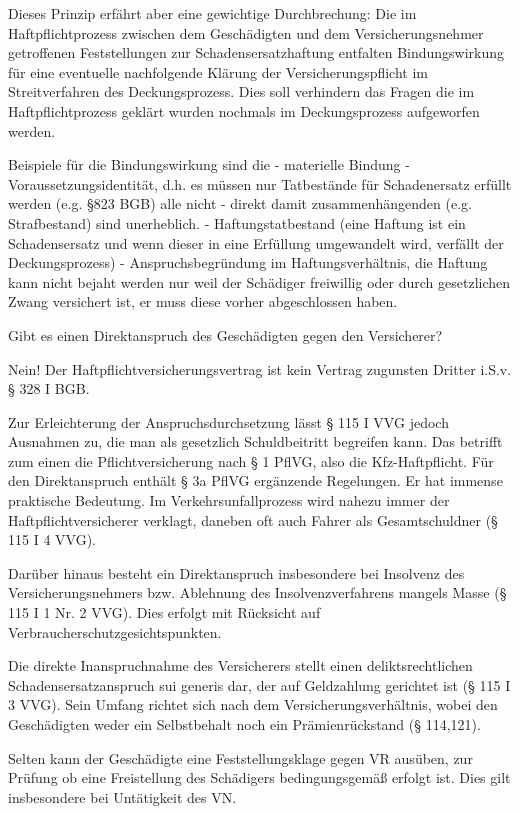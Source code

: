 Dieses Prinzip erfährt aber eine gewichtige Durchbrechung: 
Die im Haftpflichtprozess zwischen dem Geschädigten und dem Versicherungsnehmer getroffenen Feststellungen zur Schadensersatzhaftung entfalten 
Bindungswirkung für eine eventuelle nachfolgende Klärung der Versicherungspflicht im Streitverfahren des Deckungsprozess.
Dies soll verhindern das Fragen die im Haftpflichtprozess geklärt wurden nochmals im Deckungsprozess aufgeworfen werden.

Beispiele für die Bindungswirkung sind die
- materielle Bindung
- Voraussetzungsidentität, d.h. es müssen nur Tatbestände für Schadenersatz erfüllt werden (e.g. §823 BGB) alle nicht 
- direkt damit zusammenhängenden (e.g. Strafbestand) sind unerheblich.
- Haftungstatbestand (eine Haftung ist ein Schadensersatz und wenn dieser in eine Erfüllung umgewandelt wird, verfällt der Deckungsprozess)
- Anspruchsbegründung im Haftungsverhältnis, die Haftung kann nicht bejaht werden nur weil der Schädiger freiwillig oder durch gesetzlichen Zwang
  versichert ist, er muss diese vorher abgeschlossen haben.


Gibt es einen Direktanspruch des Geschädigten gegen den Versicherer?

Nein! Der Haftpflichtversicherungsvertrag ist kein Vertrag zugunsten Dritter i.S.v. § 328 I BGB.

Zur Erleichterung der Anspruchsdurchsetzung lässt § 115 I VVG jedoch Ausnahmen zu, die man als gesetzlich Schuldbeitritt begreifen kann. 
Das betrifft zum einen die Pflichtversicherung nach § 1 PflVG, also die Kfz-Haftpflicht. 
Für den Direktanspruch enthält § 3a PflVG ergänzende Regelungen. Er hat immense praktische Bedeutung. 
Im Verkehrsunfallprozess wird nahezu immer der Haftpflichtversicherer verklagt, daneben oft auch Fahrer als Gesamtschuldner (§ 115 I 4 VVG).

Darüber hinaus besteht ein Direktanspruch insbesondere bei Insolvenz des Versicherungsnehmers bzw. 
Ablehnung des Insolvenzverfahrens mangels Masse (§ 115 I 1 Nr. 2 VVG). 
Dies erfolgt mit Rücksicht auf Verbraucherschutzgesichtspunkten.

Die direkte Inanspruchnahme des Versicherers stellt einen deliktsrechtlichen Schadensersatzanspruch sui generis dar, 
der auf Geldzahlung gerichtet ist (§ 115 I 3 VVG). Sein Umfang richtet sich nach dem Versicherungsverhältnis, wobei
den Geschädigten weder ein Selbstbehalt noch ein Prämienrückstand (§ 114,121).

Selten kann der Geschädigte eine Feststellungsklage gegen VR ausüben, 
zur Prüfung ob eine Freistellung des Schädigers bedingungsgemäß erfolgt ist. 
Dies gilt insbesondere bei Untätigkeit des VN.


